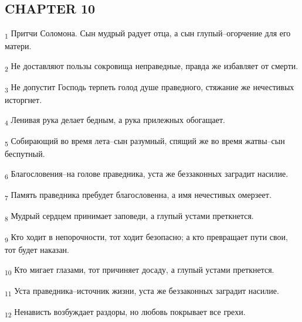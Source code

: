 \subsection{CHAPTER 10}
\begin{tcolorbox}
\textsubscript{1} Притчи Соломона. Сын мудрый радует отца, а сын глупый--огорчение для его матери.
\end{tcolorbox}
\begin{tcolorbox}
\textsubscript{2} Не доставляют пользы сокровища неправедные, правда же избавляет от смерти.
\end{tcolorbox}
\begin{tcolorbox}
\textsubscript{3} Не допустит Господь терпеть голод душе праведного, стяжание же нечестивых исторгнет.
\end{tcolorbox}
\begin{tcolorbox}
\textsubscript{4} Ленивая рука делает бедным, а рука прилежных обогащает.
\end{tcolorbox}
\begin{tcolorbox}
\textsubscript{5} Собирающий во время лета--сын разумный, спящий же во время жатвы--сын беспутный.
\end{tcolorbox}
\begin{tcolorbox}
\textsubscript{6} Благословения--на голове праведника, уста же беззаконных заградит насилие.
\end{tcolorbox}
\begin{tcolorbox}
\textsubscript{7} Память праведника пребудет благословенна, а имя нечестивых омерзеет.
\end{tcolorbox}
\begin{tcolorbox}
\textsubscript{8} Мудрый сердцем принимает заповеди, а глупый устами преткнется.
\end{tcolorbox}
\begin{tcolorbox}
\textsubscript{9} Кто ходит в непорочности, тот ходит безопасно; а кто превращает пути свои, тот будет наказан.
\end{tcolorbox}
\begin{tcolorbox}
\textsubscript{10} Кто мигает глазами, тот причиняет досаду, а глупый устами преткнется.
\end{tcolorbox}
\begin{tcolorbox}
\textsubscript{11} Уста праведника--источник жизни, уста же беззаконных заградит насилие.
\end{tcolorbox}
\begin{tcolorbox}
\textsubscript{12} Ненависть возбуждает раздоры, но любовь покрывает все грехи.
\end{tcolorbox}
